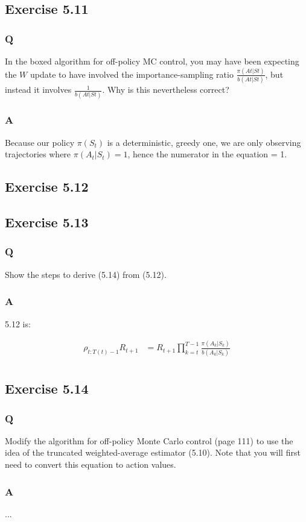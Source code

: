 \subsection*{Exercise 5.11}
\subsubsection{Q}
In the boxed algorithm for off-policy MC control, you may have been expecting the $W$ update to have involved the importance-sampling ratio $\frac{\pi (At|St)}{b(At|St)}$, but
instead it involves $\frac{1}{b(At|St)}$. Why is this nevertheless correct?
\subsubsection{A}
Because our policy $\pi(S_t)$ is a deterministic, greedy one, we are only observing trajectories where $\pi(A_t | S_t) = 1$, hence the numerator in the equation = 1.

\subsection{Exercise 5.12}
\ProgrammingExercise

\subsection*{Exercise 5.13}
\subsubsection{Q}
Show the steps to derive (5.14) from (5.12). 
\subsubsection{A}
5.12 is:

\begin{align}
\rho_{t:T(t)-1} R_{t+1} &= R_{t+1} \prod_{k = t}^{T-1} \frac{\pi(A_k | S_k)}{b(A_k | S_k)} \\
\end{align}

\subsection*{Exercise 5.14}
\subsubsection{Q}
Modify the algorithm for off-policy Monte Carlo control (page 111) to use the idea of the truncated weighted-average estimator (5.10). Note that you will first need to convert this equation to action values.
\subsubsection{A}
...